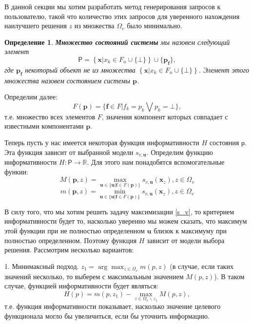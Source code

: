 \documentclass[12pt]{article}
\newtheorem{defin}{Определение}[section]
\begin{document}
В данной секции мы хотим разработать метод генерирования запросов к пользователю, такой что количество этих запросов для уверенного нахождения наилучшего решения $z$ из множества $\Omega_v$ было минимально.

\begin{defin}
\textbf{Множество состояний системы} мы назовем следующий элемент $$\mathsf{P}=\left\{\textbf{x}\Big| x_k \in F_n\cup\{\bot\}\right\}\cup\{\mathbf{p_f}\},$$
где  $\mathbf{p_f}$ некоторый объект не из множества $\left\{\textbf{x}\Big| x_k \in F_n\cup\{\bot\}\right\}$.
Элемент этого множества назовем состоянием системы $\mathbf{p}$.
\end{defin}

Определим далее:
$$F(\textbf{p}) = \{\textbf{f}\in F\Big| f_k = p_k \bigvee p_k=\bot\},$$
т.е. множество всех элементов $F$, значения компонент которых совпадает с известными компонентами $\textbf{p}$.

Теперь пусть у нас имеется некоторая функция информативности $H$ состояния $\mathsf{p}$. Эта функция зависит от выбранной модели $s_{v, \textbf{u}}$. Определим функцию информативности $H:\mathsf{P}\rightarrow \mathbb{R}$. Для этого нам понадобятся вспомогательные функии:
$$M(\textbf{p}, z) = \max\limits_{\textbf{u}\in\{\textbf{u}|\textbf{f}\in F(\textbf{p})\}}s_{v,\textbf{u}}(\textbf{x}_z), z \in \Omega_v$$
$$m(\textbf{p}, z) = \min\limits_{\textbf{u}\in\{\textbf{u}|\textbf{f}\in F(\textbf{p})\}}s_{v,\textbf{u}}(\textbf{x}_z), z \in \Omega_v$$

В силу того, что мы хотим решить задачу максимизации \ref{s_v}, то критерием информативности будет то, насколько уверенно мы можем сказать, что максимум этой функции при не полностью определенном $\textbf{u}$ близок к максимуму при полностью определенном. Поэтому функция $H$ зависит от модели выбора решения. Рассмотрим несколько вариантов:

1. Минимаксный подход. $z_1=\arg\max_{z\in \Omega_v} m(p,z)$ (в случае, если таких значений несколько, то выберем с максимальным значением $M(p,z)$). В таком случае, функцией информативности будет являться: $$H(p)=m(p,z_1)-\max_{z\in \Omega_v\backslash{z_1}}M(p,z),$$
т.е. функция информативности показывает, насколько значение целевого функционала могло бы увеличиться, если бы уточнить информацию.
\end{document}

